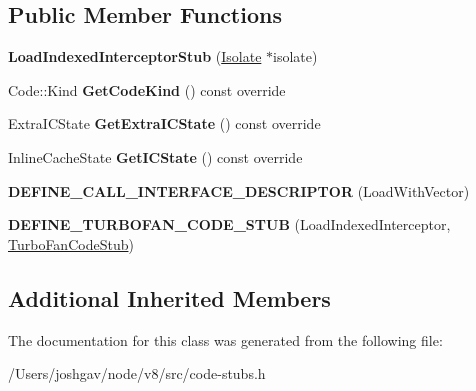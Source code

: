 \subsection*{Public Member Functions}
\begin{DoxyCompactItemize}
\item 
{\bfseries Load\+Indexed\+Interceptor\+Stub} (\hyperlink{classv8_1_1internal_1_1_isolate}{Isolate} $\ast$isolate)\hypertarget{classv8_1_1internal_1_1_load_indexed_interceptor_stub_a371d15d4d0a76f7a9942f8462b50106b}{}\label{classv8_1_1internal_1_1_load_indexed_interceptor_stub_a371d15d4d0a76f7a9942f8462b50106b}

\item 
Code\+::\+Kind {\bfseries Get\+Code\+Kind} () const  override\hypertarget{classv8_1_1internal_1_1_load_indexed_interceptor_stub_af32c44211a7cffafc9915402e1f3873e}{}\label{classv8_1_1internal_1_1_load_indexed_interceptor_stub_af32c44211a7cffafc9915402e1f3873e}

\item 
Extra\+I\+C\+State {\bfseries Get\+Extra\+I\+C\+State} () const  override\hypertarget{classv8_1_1internal_1_1_load_indexed_interceptor_stub_a0d3c970bd2d72eec7505256afb1cbe86}{}\label{classv8_1_1internal_1_1_load_indexed_interceptor_stub_a0d3c970bd2d72eec7505256afb1cbe86}

\item 
Inline\+Cache\+State {\bfseries Get\+I\+C\+State} () const  override\hypertarget{classv8_1_1internal_1_1_load_indexed_interceptor_stub_a51961576ed6c14d2e4eb7151e7f543c4}{}\label{classv8_1_1internal_1_1_load_indexed_interceptor_stub_a51961576ed6c14d2e4eb7151e7f543c4}

\item 
{\bfseries D\+E\+F\+I\+N\+E\+\_\+\+C\+A\+L\+L\+\_\+\+I\+N\+T\+E\+R\+F\+A\+C\+E\+\_\+\+D\+E\+S\+C\+R\+I\+P\+T\+OR} (Load\+With\+Vector)\hypertarget{classv8_1_1internal_1_1_load_indexed_interceptor_stub_a72346f9b4054af175eadf1a59c6d0c4f}{}\label{classv8_1_1internal_1_1_load_indexed_interceptor_stub_a72346f9b4054af175eadf1a59c6d0c4f}

\item 
{\bfseries D\+E\+F\+I\+N\+E\+\_\+\+T\+U\+R\+B\+O\+F\+A\+N\+\_\+\+C\+O\+D\+E\+\_\+\+S\+T\+UB} (Load\+Indexed\+Interceptor, \hyperlink{classv8_1_1internal_1_1_turbo_fan_code_stub}{Turbo\+Fan\+Code\+Stub})\hypertarget{classv8_1_1internal_1_1_load_indexed_interceptor_stub_a484bc72f4c40eebe52e88f5d8d41a9d6}{}\label{classv8_1_1internal_1_1_load_indexed_interceptor_stub_a484bc72f4c40eebe52e88f5d8d41a9d6}

\end{DoxyCompactItemize}
\subsection*{Additional Inherited Members}


The documentation for this class was generated from the following file\+:\begin{DoxyCompactItemize}
\item 
/\+Users/joshgav/node/v8/src/code-\/stubs.\+h\end{DoxyCompactItemize}
